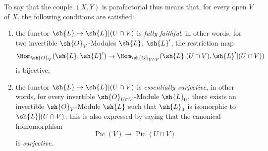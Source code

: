 To say that the couple $(X,Y)$ is parafactorial thus means that, for every open $V$ of $X$, the following conditions are satisfied:
\begin{enumerate}
  \item[$1\textsuperscript{o}$] the functor $\sh{L}\mapsto\sh{L}|(U\cap V)$ is \emph{fully faithful}, in other words, for two invertible $\sh{O}_V$-Modules $\sh{L}$, $\sh{L}'$, the restriction map
\[
  \Hom_{\sh{O}_V}(\sh{L},\sh{L}')\to\Hom_{\sh{O}_{U\cap V}}(\sh{L}|(U\cap V),\sh{L}'|(U\cap V))
\]
is bijective;
  \item[$2\textsuperscript{o}$] the functor $\sh{L}\mapsto\sh{L}|(U\cap V)$ is \emph{essentially surjective}, in other words, for every invertible $\sh{O}_{U\cap V}$-Module $\sh{L}_0$, there exists an invertible $\sh{O}_V$-Module $\sh{L}$ such that $\sh{L}_0$ is isomorphic to $\sh{L}|(U\cap V)$; this is also expressed by saying that the canonical homomorphism 
\[
  \operatorname{Pic}(V)\to\operatorname{Pic}(U\cap V)
\]
is \emph{surjective}.
\end{enumerate}

